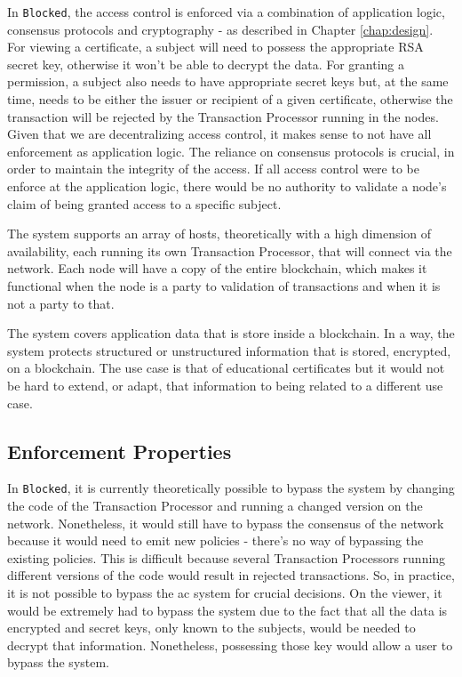 In \texttt{Blocked}, the access control is enforced via a combination of application logic, consensus protocols and cryptography - as described in Chapter \ref{chap:design}. For viewing a certificate, a subject will need to possess the appropriate RSA secret key, otherwise it won't be able to decrypt the data. For granting a permission, a subject also needs to have appropriate secret keys but, at the same time, needs to be either the issuer or recipient of a given certificate, otherwise the transaction will be rejected by the Transaction Processor running in the nodes. Given that we are decentralizing access control, it makes sense to not have all enforcement as application logic. The reliance on consensus protocols is crucial, in order to maintain the integrity of the access. If all access control were to be enforce at the application logic, there would be no authority to validate a node's claim of being granted access to a specific subject.

The system supports an array of hosts, theoretically with a high dimension of availability, each running its own Transaction Processor, that will connect via the network. Each node will have a copy of the entire blockchain, which makes it functional when the node is a party to validation of transactions and when it is not a party to that. 

The system covers application data that is store inside a blockchain. In a way, the system protects structured or unstructured information that is stored, encrypted, on a blockchain. The use case is that of educational certificates but it would not be hard to extend, or adapt, that information to being related to a different use case.

\subsection{Enforcement Properties}

In \texttt{Blocked}, it is currently theoretically possible to bypass the system by changing the code of the Transaction Processor and running a changed version on the network. Nonetheless, it would still have to bypass the consensus of the network because it would need to emit new policies - there's no way of bypassing the existing policies. This is difficult because several Transaction Processors running different versions of the code would result in rejected transactions. So, in practice, it is not possible to bypass the \gls{ac} system for crucial decisions. On the viewer, it would be extremely had to bypass the system due to the fact that all the data is encrypted and secret keys, only known to the subjects, would be needed to decrypt that information. Nonetheless, possessing those key would allow a user to bypass the system. 

